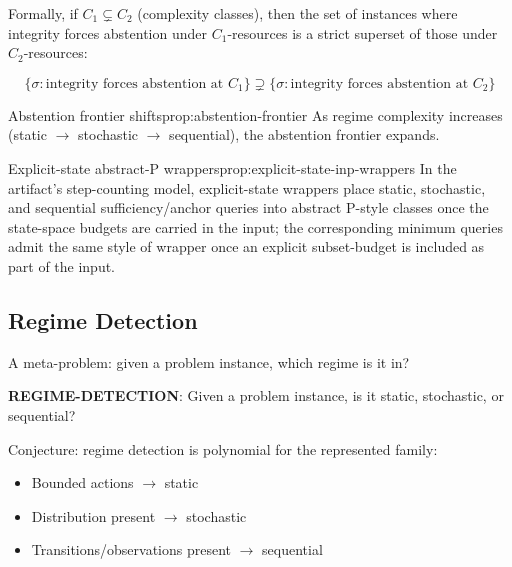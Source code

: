 Formally, if $C_1 \subsetneq C_2$ (complexity classes), then the set of instances where integrity forces abstention under $C_1$-resources is a strict superset of those under $C_2$-resources:

\[
\{\sigma : \text{integrity forces abstention at } C_1\}
\supsetneq
\{\sigma : \text{integrity forces abstention at } C_2\}
\]

\begin{claim}{Abstention frontier shifts}{prop:abstention-frontier}
As regime complexity increases (static $\to$ stochastic $\to$ sequential), the abstention frontier expands.
\end{claim}


\begin{claim}{Explicit-state abstract-\textsc{P} wrappers}{prop:explicit-state-inp-wrappers}
In the artifact's step-counting model, explicit-state wrappers place static,
stochastic, and sequential sufficiency/anchor queries into abstract
\textsc{P}-style classes once the state-space budgets are carried in the input;
the corresponding minimum queries admit the same style of wrapper once an
explicit subset-budget is included as part of the input.
\end{claim}


\subsection{Regime Detection}

A meta-problem: given a problem instance, which regime is it in?

\begin{decision}\label{dec:regime-detection}
\textbf{REGIME-DETECTION}: Given a problem instance, is it static, stochastic, or sequential?
\end{decision}

Conjecture: regime detection is polynomial for the represented family:
\begin{itemize}
\item Bounded actions $\to$ static
\item Distribution present $\to$ stochastic  
\item Transitions/observations present $\to$ sequential
\end{itemize}

